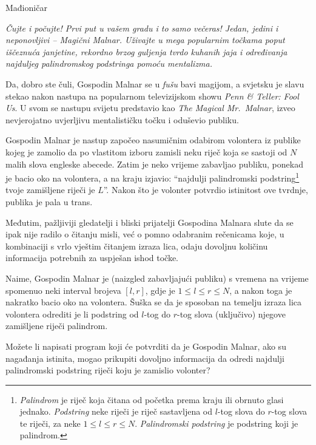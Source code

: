 \begin{statement}[
  problempoints=100,
  timelimit=1 sekunda,
  memorylimit=512 MiB,
]{Mađioničar}

\textit{Čujte i počujte! Prvi put u vašem gradu i to samo večeras! Jedan, jedini i
neponovljivi -- Magični Malnar. Uživajte u mega popularnim točkama poput
iščeznuća janjetine, rekordno brzog guljenja tvrdo kuhanih jaja i određivanja
  najduljeg palindromskog podstringa pomoću mentalizma.}

Da, dobro ste čuli, Gospodin Malnar se u \textit{fušu} bavi magijom, a svjetsku
je slavu stekao nakon nastupa na popularnom televizijskom showu
\textit{Penn \& Teller: Fool Us}. U svom se nastupu svijetu predstavio kao
\textit{The Magical Mr.\ Malnar}, izveo nevjerojatno uvjerljivu mentalističku
točku i oduševio publiku.

Gospodin Malnar je nastup započeo nasumičnim odabirom volontera iz publike kojeg
je zamolio da po vlastitom izboru zamisli neku riječ koja se sastoji od $N$
malih slova engleske abecede. Zatim je neko vrijeme zabavljao publiku, ponekad
je bacio oko na volontera, a na kraju izjavio: ``najdulji palindromski podstring\footnote{
\textit{Palindrom} je riječ koja čitana od početka prema kraju ili obrnuto glasi jednako. \textit{Podstring} neke riječi je riječ sastavljena od $l$-tog slova do $r$-tog slova te riječi, za neke $1 \leq l \leq r \leq N$. \textit{Palindromski podstring} je podstring koji je palindrom.
}
tvoje zamišljene riječi je $L$''. Nakon što je volonter potvrdio istinitost ove
tvrdnje, publika je pala u trans.

Međutim, pažljiviji gledatelji i bliski prijatelji Gospodina Malnara slute da
se ipak nije radilo o čitanju misli, već o pomno odabranim rečenicama koje, u
kombinaciji s vrlo vještim čitanjem izraza lica, odaju dovoljnu količinu
informacija potrebnih za uspješan ishod točke.

Naime, Gospodin Malnar je (naizgled zabavljajući publiku) s vremena na vrijeme
spomenuo neki interval brojeva $[l, r]$, gdje je $1 \le l \le r \le N$, a
nakon toga je nakratko bacio oko na volontera. Šuška se da je sposoban na
temelju izraza lica volontera odrediti je li podstring od $l$-tog do $r$-tog
slova (uključivo) njegove zamišljene riječi palindrom.

Možete li napisati program koji će potvrditi da je Gospodin Malnar, ako su
nagađanja istinita, mogao prikupiti dovoljno informacija da odredi najdulji
palindromski podstring riječi koju je zamislio volonter?


\end{statement}
